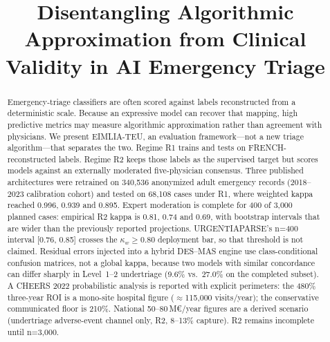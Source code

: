 \documentclass[conference]{IEEEtran}
\begin{document}
\title{Disentangling Algorithmic Approximation from Clinical Validity in AI Emergency Triage}

\author{
}

\maketitle
\thispagestyle{empty}

\begin{abstract}
Emergency-triage classifiers are often scored against labels reconstructed from a deterministic scale. Because an expressive model can recover that mapping, high predictive metrics may measure algorithmic approximation rather than agreement with physicians. We present EIMLIA-TEU, an evaluation framework---not a new triage algorithm---that separates the two. Regime R1 trains and tests on FRENCH-reconstructed labels. Regime R2 keeps those labels as the supervised target but scores models against an externally moderated five-physician consensus. Three published architectures were retrained on 340,536 anonymized adult emergency records (2018--2023 calibration cohort) and tested on 68,108 cases under R1, where weighted kappa reached 0.996, 0.939 and 0.895. Expert moderation is complete for 400 of 3,000 planned cases: empirical R2 kappa is 0.81, 0.74 and 0.69, with bootstrap intervals that are wider than the previously reported projections. URGENTIAPARSE's n=400 interval [0.76, 0.85] crosses the $\kappa_w\geq0.80$ deployment bar, so that threshold is not claimed. Residual errors injected into a hybrid DES--MAS engine use class-conditional confusion matrices, not a global kappa, because two models with similar concordance can differ sharply in Level~1--2 undertriage (9.6\% vs.\ 27.0\% on the completed subset). A CHEERS 2022 probabilistic analysis is reported with explicit perimeters: the 480\% three-year ROI is a mono-site hospital figure ($\approx$115,000 visits/year); the conservative communicated floor is 210\%. National 50--80\,M€/year figures are a derived scenario (undertriage adverse-event channel only, R2, 8--13\% capture). R2 remains incomplete until n=3,000.
\end{abstract}
\end{document}
